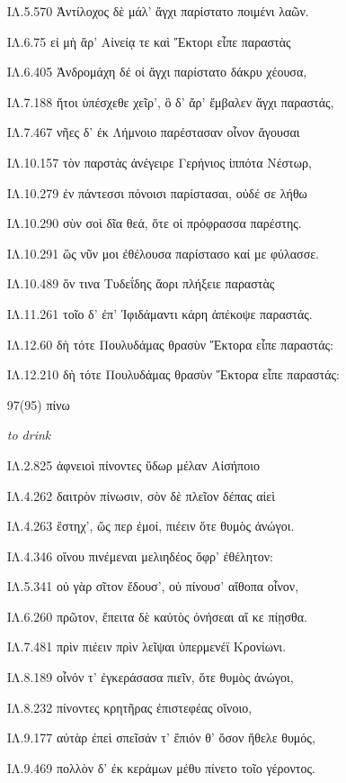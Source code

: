 \begin{enumerate}
{ΙΛ.5.570 Ἀντίλοχος δὲ μάλ' ἄγχι παρίστατο ποιμένι λαῶν. 

ΙΛ.6.75 εἰ μὴ ἄρ' Αἰνείᾳ τε καὶ Ἕκτορι εἶπε παραστὰς 

ΙΛ.6.405 Ἀνδρομάχη δέ οἱ ἄγχι παρίστατο δάκρυ χέουσα, 

ΙΛ.7.188 ἤτοι ὑπέσχεθε χεῖρ', ὃ δ' ἄρ' ἔμβαλεν ἄγχι παραστάς, 

ΙΛ.7.467 νῆες δ' ἐκ Λήμνοιο παρέστασαν οἶνον ἄγουσαι 

ΙΛ.10.157 τὸν παρστὰς ἀνέγειρε Γερήνιος ἱππότα Νέστωρ, 

ΙΛ.10.279 ἐν πάντεσσι πόνοισι παρίστασαι, οὐδέ σε λήθω 

ΙΛ.10.290 σὺν σοὶ δῖα θεά, ὅτε οἱ πρόφρασσα παρέστης. 

ΙΛ.10.291 ὣς νῦν μοι ἐθέλουσα παρίστασο καί με φύλασσε. 

ΙΛ.10.489 ὅν τινα Τυδεΐδης ἄορι πλήξειε παραστὰς 

ΙΛ.11.261 τοῖο δ' ἐπ' Ἰφιδάμαντι κάρη ἀπέκοψε παραστάς. 

ΙΛ.12.60 δὴ τότε Πουλυδάμας θρασὺν Ἕκτορα εἶπε παραστάς: 

ΙΛ.12.210 δὴ τότε Πουλυδάμας θρασὺν Ἕκτορα εἶπε παραστάς: 

}

\clearpage
\item[\large 97(95)]{\large \g πίνω}

\hspace{0.2cm} \textit{ to drink }

{\g
ΙΛ.2.825 ἀφνειοὶ πίνοντες ὕδωρ μέλαν Αἰσήποιο 

ΙΛ.4.262 δαιτρὸν πίνωσιν, σὸν δὲ πλεῖον δέπας αἰεὶ 

ΙΛ.4.263 ἕστηχ', ὥς περ ἐμοί, πιέειν ὅτε θυμὸς ἀνώγοι. 

ΙΛ.4.346 οἴνου πινέμεναι μελιηδέος ὄφρ' ἐθέλητον: 

ΙΛ.5.341 οὐ γὰρ σῖτον ἔδουσ', οὐ πίνουσ' αἴθοπα οἶνον, 

ΙΛ.6.260 πρῶτον, ἔπειτα δὲ καὐτὸς ὀνήσεαι αἴ κε πίῃσθα. 

ΙΛ.7.481 πρὶν πιέειν πρὶν λεῖψαι ὑπερμενέϊ Κρονίωνι. 

ΙΛ.8.189 οἶνόν τ' ἐγκεράσασα πιεῖν, ὅτε θυμὸς ἀνώγοι, 

ΙΛ.8.232 πίνοντες κρητῆρας ἐπιστεφέας οἴνοιο, 

ΙΛ.9.177 αὐτὰρ ἐπεὶ σπεῖσάν τ' ἔπιόν θ' ὅσον ἤθελε θυμός, 

ΙΛ.9.469 πολλὸν δ' ἐκ κεράμων μέθυ πίνετο τοῖο γέροντος. 

}
\end{enumerate}
